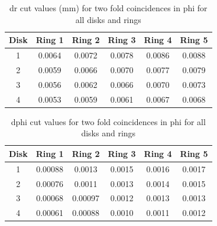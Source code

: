 \begin{table}[H]
  \centering
  \caption[dr cut values for two-fold in phi]{dr cut values (mm) for two fold coincidences in phi for all disks and rings}
  \begin{tabular}{cccccc}
    \textbf{Disk} & \textbf{Ring 1} & \textbf{Ring 2} & \textbf{Ring 3} & \textbf{Ring 4} & \textbf{Ring 5} \\
    \hline
    1  & 0.0064 & 0.0072  & 0.0078 & 0.0086 & 0.0088 \\
    2  & 0.0059 & 0.0066 & 0.0070 & 0.0077 & 0.0079 \\
    3  & 0.0056 & 0.0062 & 0.0066 & 0.0070  & 0.0073 \\
    4  & 0.0053  & 0.0059 & 0.0061  & 0.0067 & 0.0068 \\
  \end{tabular}
  \label{tab:disk_values}
\end{table}

\begin{table}[H]
  \centering
  \caption[dphi cut values for two-fold in phi]{dphi cut values for two fold coincidences in phi for all disks and rings}
  \begin{tabular}{cccccc}
    \textbf{Disk} & \textbf{Ring 1} & \textbf{Ring 2} & \textbf{Ring 3} & \textbf{Ring 4} & \textbf{Ring 5} \\
    \hline
    1  & 0.00088  & 0.0013   & 0.0015    & 0.0016   & 0.0017   \\
    2  & 0.00076   & 0.0011   & 0.0013   & 0.0014   & 0.0015   \\
    3  & 0.00068  & 0.00097  & 0.0012   & 0.0013   & 0.0013   \\
    4  & 0.00061  & 0.00088  & 0.0010   & 0.0011   & 0.0012   \\
  \end{tabular}
  \label{tab:mdphi_cuts_values}
\end{table}


